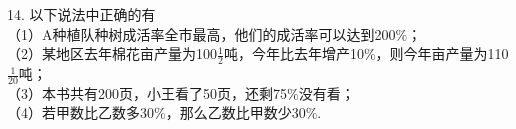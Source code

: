 14.	以下说法中正确的有\key{\hspace{1cm}} \\

（1）A种植队种树成活率全市最高，他们的成活率可以达到200$\%$；\\

（2）某地区去年棉花亩产量为100$\frac{1}{2}$吨，今年比去年增产10$\%$，则今年亩产量为110$\frac{1}{20}$吨；\\

（3）本书共有200页，小王看了50页，还剩75$\%$没有看；\\

（4）若甲数比乙数多30$\%$，那么乙数比甲数少30$\%$.




